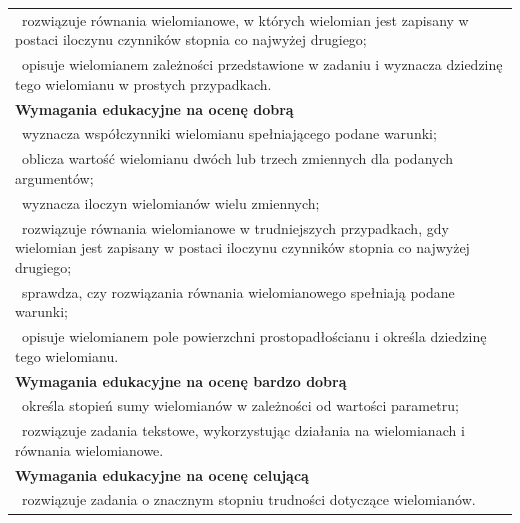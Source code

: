 \documentclass[12pt,a4paper]{article}
\begin{document}
\begin{longtable}{|p{16cm}|}
		\textbullet\ rozwiązuje równania wielomianowe, w których wielomian jest zapisany w postaci iloczynu czynników stopnia co najwyżej drugiego; \\
		
		\textbullet\ opisuje wielomianem zależności przedstawione w zadaniu i wyznacza dziedzinę tego wielomianu w prostych przypadkach. \\ \hline
		
		\textbf{Wymagania edukacyjne na ocenę dobrą} \\ \hline
		
		\textbullet\ wyznacza współczynniki wielomianu spełniającego podane warunki; \\
		
		\textbullet\ oblicza wartość wielomianu dwóch lub trzech zmiennych dla podanych argumentów; \\
		
		\textbullet\ wyznacza iloczyn wielomianów wielu zmiennych; \\
		
		\textbullet\ rozwiązuje równania wielomianowe w trudniejszych przypadkach, gdy wielomian jest zapisany w postaci iloczynu czynników stopnia co najwyżej drugiego; \\
		
		\textbullet\ sprawdza, czy rozwiązania równania wielomianowego spełniają podane warunki; \\
		
		\textbullet\ opisuje wielomianem pole powierzchni prostopadłościanu i określa dziedzinę tego wielomianu. \\ \hline
		
		\textbf{Wymagania edukacyjne na ocenę bardzo dobrą} \\ \hline
		
		\textbullet\ określa stopień sumy wielomianów w zależności od wartości parametru; \\
		
		\textbullet\ rozwiązuje zadania tekstowe, wykorzystując działania na wielomianach i równania wielomianowe. \\ \hline
		
		\textbf{Wymagania edukacyjne na ocenę celującą} \\ \hline
		
		\textbullet\ rozwiązuje zadania o znacznym stopniu trudności dotyczące wielomianów. \\ \hline
		
	\end{longtable}
	
\end{document}
